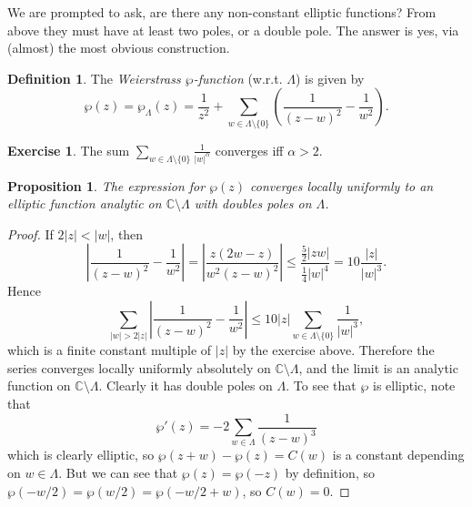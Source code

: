 \documentclass[a4paper]{article}
\newtheorem{proposition}[theorem]{Proposition}
\theoremstyle{definition}
\newtheorem*{definition}{Definition}
\newtheorem*{exercise}{Exercise}
\newcommand{\C}{\mathbb{C}}
\begin{document}
We are prompted to ask, are there any non-constant elliptic functions? From
above they must have at least two poles, or a double pole. The answer is yes,
via (almost) the most obvious construction.

\begin{definition}
    The \emph{Weierstrass $\wp$-function} (w.r.t. $\Lambda$) is given by
    \begin{equation*}
        \wp(z) = \wp_\Lambda(z)
            = \frac{1}{z^2} + \sum_{w\in\Lambda\setminus\{0\}}
                \left(\frac{1}{(z-w)^2}-\frac{1}{w^2}\right).
    \end{equation*}
\end{definition}

\begin{exercise}
    The sum $\sum_{w\in\Lambda\setminus\{0\}}\frac{1}{|w|^\alpha}$ converges iff
    $\alpha>2$.
\end{exercise}

\begin{proposition}
    The expression for $\wp(z)$ converges locally uniformly to an elliptic
    function analytic on $\C\setminus\Lambda$ with doubles poles on $\Lambda$.
\end{proposition}

\begin{proof}
    If $2|z|<|w|$, then
    \begin{equation*}
        \left|\frac{1}{(z-w)^2}-\frac{1}{w^2}\right|
            = \left|\frac{z(2w-z)}{w^2(z-w)^2}\right|
            \le \frac{\frac{5}{2}|zw|}{\frac{1}{4}|w|^4}
            = 10\frac{|z|}{|w|^3}.
    \end{equation*}
    Hence
    \begin{equation*}
        \sum_{|w|>2|z|}\left|\frac{1}{(z-w)^2}-\frac{1}{w^2}\right|
        \le 10|z|\sum_{w\in\Lambda\setminus\{0\}}\frac{1}{|w|^3},
    \end{equation*}
    which is a finite constant multiple of $|z|$ by the exercise above.
    Therefore the series converges locally uniformly absolutely on
    $\C\setminus\Lambda$, and the limit is an analytic function on
    $\C\setminus\Lambda$. Clearly it has double poles on $\Lambda$. To see that
    $\wp$ is elliptic, note that
    \begin{equation*}
        \wp'(z) = -2\sum_{w\in\Lambda}\frac{1}{(z-w)^3}
    \end{equation*}
    which is clearly elliptic, so $\wp(z+w)-\wp(z)=C(w)$ is a constant depending
    on $w\in\Lambda$. But we can see that $\wp(z)=\wp(-z)$ by definition, so
    $\wp(-w/2)=\wp(w/2)=\wp(-w/2+w)$, so $C(w)=0$.
\end{proof}
\end{document}
